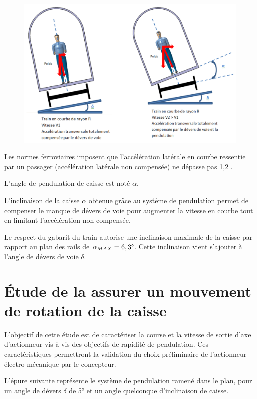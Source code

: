 \begin{figure}[!h]
 \centering\includegraphics[width=0.8\linewidth]{img/fig6_b}
 \label{img06_b}
\end{figure}

Les normes ferroviaires imposent que l'accélération latérale en courbe ressentie par un passager (accélération latérale non compensée) ne dépasse pas 1,2 .

L'angle de pendulation de caisse est noté $\alpha$.

L'inclinaison de la caisse $\alpha$ obtenue grâce au système de pendulation permet de compenser le manque de dévers de voie pour augmenter la vitesse en courbe tout en limitant l'accélération non compensée.

Le respect du gabarit du train autorise une inclinaison maximale de la caisse par rapport au plan des rails de $\alpha_{MAX}=6,3\degree$. Cette inclinaison vient s'ajouter à l'angle de dévers de voie $\delta$.



\section{Étude de la \og assurer un mouvement de rotation de la caisse \fg}

L'objectif de cette étude est de caractériser la course et la vitesse de sortie d'axe d'actionneur vis-à-vis des objectifs de rapidité de pendulation. Ces caractéristiques permettront la validation du choix préliminaire de l'actionneur électro-mécanique par le concepteur.

L'épure suivante représente le système de pendulation ramené dans le plan, pour un angle de dévers $\delta$ de 5° et un angle quelconque d'inclinaison de caisse.

